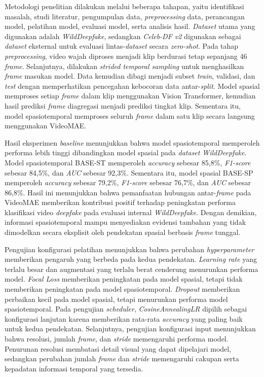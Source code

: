 \begin{center}
	Metodologi penelitian dilakukan melalui beberapa tahapan, yaitu identifikasi masalah, studi literatur, pengumpulan data, \textit{preprocessing} data, perancangan model, pelatihan model, evaluasi model, serta analisis hasil. \textit{Dataset} utama yang digunakan adalah \textit{WildDeepfake}, sedangkan \textit{Celeb-DF v2} digunakan sebagai \textit{dataset} eksternal untuk evaluasi lintas-\textit{dataset} secara \textit{zero-shot}. Pada tahap \textit{preprocessing}, video wajah diproses menjadi klip berdurasi tetap sepanjang 46 \textit{frame}. Selanjutnya, dilakukan \textit{strided temporal sampling} untuk menghasilkan \textit{frame} masukan model. Data kemudian dibagi menjadi subset \textit{train}, validasi, dan \textit{test} dengan memperhatikan pencegahan kebocoran data antar-\textit{split}. Model spasial memproses setiap \textit{frame} dalam klip menggunakan Vision Transformer, kemudian hasil prediksi \textit{frame} diagregasi menjadi prediksi tingkat klip. Sementara itu, model spasiotemporal memproses seluruh \textit{frame} dalam satu klip secara langsung menggunakan VideoMAE. \par

	Hasil eksperimen \textit{baseline} menunjukkan bahwa model spasiotemporal memperoleh performa lebih tinggi dibandingkan model spasial pada \textit{dataset} \textit{WildDeepfake}. Model spasiotemporal BASE-ST memperoleh \textit{accuracy} sebesar 85,8\%, \textit{F1-score} sebesar 84,5\%, dan \textit{AUC} sebesar 92,3\%. Sementara itu, model spasial BASE-SP memperoleh \textit{accuracy} sebesar 79,2\%, \textit{F1-score} sebesar 76,7\%, dan \textit{AUC} sebesar 86,8\%. Hasil ini menunjukkan bahwa pemanfaatan hubungan antar-\textit{frame} pada VideoMAE memberikan kontribusi positif terhadap peningkatan performa klasifikasi video \textit{deepfake} pada evaluasi internal \textit{WildDeepfake}. Dengan demikian, informasi spasiotemporal mampu menyediakan evidensi tambahan yang tidak dimodelkan secara eksplisit oleh pendekatan spasial berbasis \textit{frame} tunggal. \par

	Pengujian konfigurasi pelatihan menunjukkan bahwa perubahan \textit{hyperparameter} memberikan pengaruh yang berbeda pada kedua pendekatan. \textit{Learning rate} yang terlalu besar dan augmentasi yang terlalu berat cenderung menurunkan performa model. \textit{Focal Loss} memberikan peningkatan pada model spasial, tetapi tidak memberikan peningkatan pada model spasiotemporal. \textit{Dropout} memberikan perbaikan kecil pada model spasial, tetapi menurunkan performa model spasiotemporal. Pada pengujian \textit{scheduler}, \textit{CosineAnnealingLR} dipilih sebagai konfigurasi lanjutan karena memberikan rata-rata \textit{accuracy} yang paling baik untuk kedua pendekatan. Selanjutnya, pengujian konfigurasi input menunjukkan bahwa resolusi, jumlah \textit{frame}, dan \textit{stride} memengaruhi performa model. Penurunan resolusi membatasi detail visual yang dapat dipelajari model, sedangkan perubahan jumlah \textit{frame} dan \textit{stride} memengaruhi cakupan serta kepadatan informasi temporal yang tersedia. \par


\end{center}

